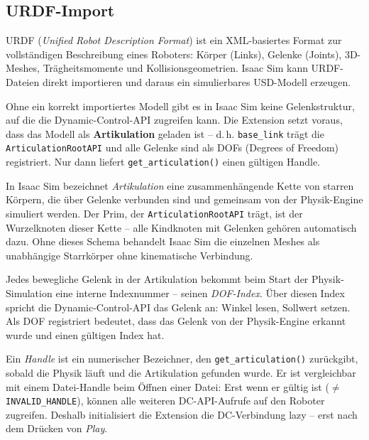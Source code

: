\documentclass[11pt,a4paper]{article}
\begin{document}
\subsection{URDF-Import}

URDF (\textit{Unified Robot Description Format}) ist ein XML-basiertes
Format zur vollständigen Beschreibung eines Roboters: Körper (Links),
Gelenke (Joints), 3D-Meshes, Trägheitsmomente und Kollisionsgeometrien.
Isaac Sim kann URDF-Dateien direkt importieren und daraus ein
simulierbares USD-Modell erzeugen.

Ohne ein korrekt importiertes Modell gibt es in Isaac Sim keine
Gelenkstruktur, auf die die Dynamic-Control-API zugreifen kann.
Die Extension setzt voraus, dass das Modell als
\textbf{Artikulation} geladen ist -- d.\,h. \texttt{base\_link}
trägt die \texttt{ArticulationRootAPI} und alle Gelenke sind als
DOFs (Degrees of Freedom) registriert. Nur dann liefert
\texttt{get\_articulation()} einen gültigen Handle.

\begin{description}[leftmargin=4cm, style=nextline]
  \item[Artikulation]
    In Isaac Sim bezeichnet \emph{Artikulation} eine zusammenhängende
    Kette von starren Körpern, die über Gelenke verbunden sind und
    gemeinsam von der Physik-Engine simuliert werden. Der Prim, der
    \texttt{ArticulationRootAPI} trägt, ist der Wurzelknoten dieser
    Kette -- alle Kindknoten mit Gelenken gehören automatisch dazu.
    Ohne dieses Schema behandelt Isaac Sim die einzelnen Meshes als
    unabhängige Starrkörper ohne kinematische Verbindung.

  \item[DOF (Degree of Freedom)]
    Jedes bewegliche Gelenk in der Artikulation bekommt beim Start
    der Physik-Simulation eine interne Indexnummer -- seinen
    \emph{DOF-Index}. Über diesen Index spricht die
    Dynamic-Control-API das Gelenk an: Winkel lesen,
    Sollwert setzen. \glqq Als DOF registriert\grqq{} bedeutet,
    dass das Gelenk von der Physik-Engine erkannt wurde und
    einen gültigen Index hat.

  \item[Handle]
    Ein \emph{Handle} ist ein numerischer Bezeichner, den
    \texttt{get\_articulation()} zurückgibt, sobald die Physik
    läuft und die Artikulation gefunden wurde. Er ist vergleichbar
    mit einem Datei-Handle beim Öffnen einer Datei: Erst wenn er
    gültig ist (\(\neq\) \texttt{INVALID\_HANDLE}), können alle
    weiteren DC-API-Aufrufe auf den Roboter zugreifen. Deshalb
    initialisiert die Extension die DC-Verbindung lazy -- erst
    nach dem Drücken von \emph{Play}.
\end{description}
\end{document}
